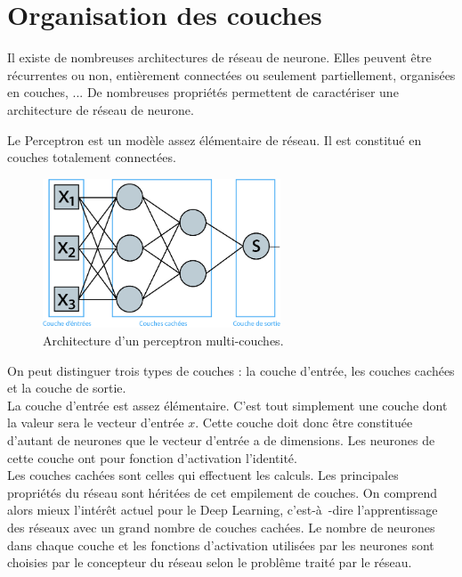\documentclass[a4paper,twoside]{report}
\begin{document}
            \section{Organisation des couches}

                Il existe de nombreuses architectures de réseau de neurone. Elles peuvent être récurrentes ou non, entièrement connectées ou seulement partiellement, organisées en couches, ... De nombreuses propriétés permettent de caractériser une architecture de réseau de neurone.

                Le Perceptron est un modèle assez élémentaire de réseau. Il est constitué en couches totalement connectées.

                \begin{figure}
                    \begin{center}
                        \includegraphics[width=200pt]{Images/perceptron-01.png}
                    \end{center}
                    \caption{Architecture d'un perceptron multi-couches.}
                \end{figure}

                On peut distinguer trois types de couches : la couche d'entrée, les couches cachées et la couche de sortie.\\

                La couche d'entrée est assez élémentaire. C'est tout simplement une couche dont la valeur sera le vecteur d'entrée $x$. Cette couche doit donc être constituée d'autant de neurones que le vecteur d'entrée a de dimensions. Les neurones de cette couche ont pour fonction d'activation l'identité.\\

                Les couches cachées sont celles qui effectuent les calculs. Les principales propriétés du réseau sont héritées de cet empilement de couches. On comprend alors mieux l'intérêt actuel pour le Deep Learning, c'est-à -dire l'apprentissage des réseaux avec un grand nombre de couches cachées.
                Le nombre de neurones dans chaque couche et les fonctions d'activation utilisées par les neurones sont choisies par le concepteur du réseau selon le problême traité par le réseau.\\
\end{document}
